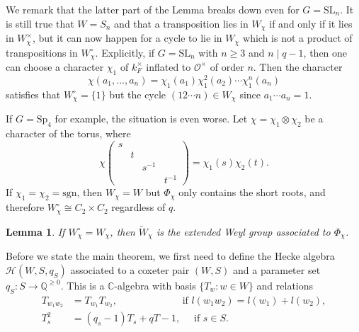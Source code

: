 \documentclass{article}
\newcommand{\cO}{\mathcal{O}}
\newcommand{\cH}{\mathcal{H}}
\newcommand{\CC}{\mathbb{C}}
\newcommand{\QQ}{\mathbb{Q}}
\theoremstyle{plain}
\newtheorem{lemma}[theorem]{Lemma}
\theoremstyle{definition}
\begin{document}
    We remark that the latter part of the Lemma breaks down even for $G=\mathrm{SL}_n$. It is still true that $W=S_n$ and that a transposition lies in $W_\chi$ if and only if it lies in $W_\chi^\times$, but it can now happen for a cycle to lie in $W_\chi$ which is not a product of transpositions in $W_\chi^\circ$. Explicitly, if $G=\mathrm{SL}_n$ with $n\geq3$ and $n\mid q-1$, then one can choose a character $\chi_1$ of $k_F^\times$ inflated to $\cO^\times$ of order $n$. Then the character 
    $$\chi(a_1,\ldots,a_n)=\chi_1(a_1)\chi_1^2(a_2)\cdots\chi_1^n(a_n)$$
    satisfies that $W_\chi^\circ=\{1\}$ but the cycle $(12\cdots n)\in W_\chi$ since $a_1\cdots a_n=1$.

    If $G=\mathrm{Sp}_4$ for example, the situation is even worse. Let $\chi=\chi_1\otimes\chi_2$ be a character of the torus, where 
    \begin{equation}
        \chi\left(\begin{smallmatrix}
            s&&&\\
            &t&&\\
            &&s^{-1}&\\
            &&&t^{-1}
        \end{smallmatrix}\right)=\chi_1(s)\chi_2(t).
    \end{equation}
    If $\chi_1=\chi_2=\textrm{sgn}$, then $W_\chi=W$ but $\Phi_\chi$ only contains the short roots, and therefore $W_\chi^\circ\cong C_2\times C_2$ regardless of $q$.

    \begin{lemma}
        If $W_\chi^\circ=W_\chi$, then $\tilde{W}_\chi$ is the extended Weyl group associated to $\Phi_\chi$. 
    \end{lemma}

    Before we state the main theorem, we first need to define the Hecke algebra $\cH(W,S,q_S)$ associated to a coxeter pair $(W,S)$ and a parameter set $q_S:S\rightarrow\QQ^{\geq0}$. This is a $\CC$-algebra with basis $\{T_w:w\in W\}$ and relations
    \begin{align*}
        T_{w_1w_2}&=T_{w_1}T_{w_2}, \ \quad\quad\quad\quad\quad\quad\text{ if } l(w_1w_2)=l(w_1)+l(w_2),\\
        T_s^2&=(q_s-1)T_s+qT-1,\quad \text{ if } s\in S.
    \end{align*}
\end{document}
